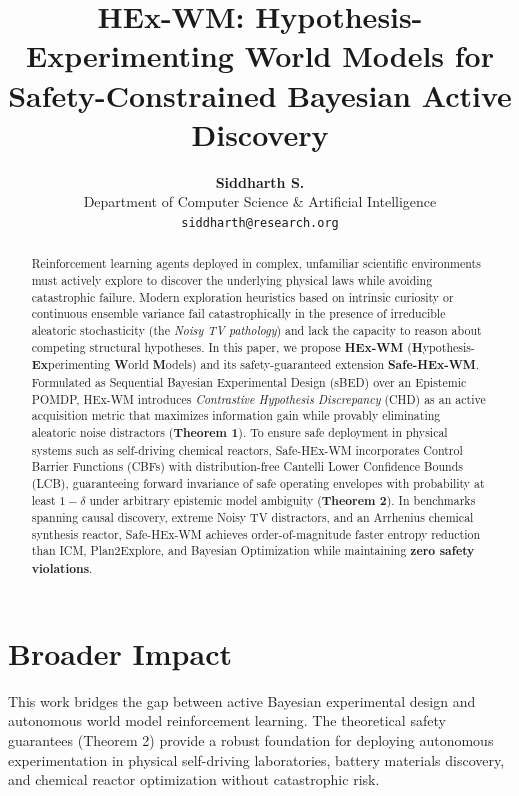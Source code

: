 \documentclass{article}
\title{\textbf{HEx-WM: Hypothesis-Experimenting World Models for Safety-Constrained Bayesian Active Discovery}}
\author{
  \textbf{Siddharth S.}\\
  Department of Computer Science \& Artificial Intelligence\\
  \texttt{siddharth@research.org}
}
\begin{document}
\maketitle

\begin{abstract}
Reinforcement learning agents deployed in complex, unfamiliar scientific environments must actively explore to discover the underlying physical laws while avoiding catastrophic failure. Modern exploration heuristics based on intrinsic curiosity or continuous ensemble variance fail catastrophically in the presence of irreducible aleatoric stochasticity (the \emph{Noisy TV pathology}) and lack the capacity to reason about competing structural hypotheses. In this paper, we propose \textbf{HEx-WM} (\textbf{H}ypothesis-\textbf{Ex}perimenting \textbf{W}orld \textbf{M}odels) and its safety-guaranteed extension \textbf{Safe-HEx-WM}. Formulated as Sequential Bayesian Experimental Design (sBED) over an Epistemic POMDP, HEx-WM introduces \emph{Contrastive Hypothesis Discrepancy} (CHD) as an active acquisition metric that maximizes information gain while provably eliminating aleatoric noise distractors (\textbf{Theorem 1}). To ensure safe deployment in physical systems such as self-driving chemical reactors, Safe-HEx-WM incorporates Control Barrier Functions (CBFs) with distribution-free Cantelli Lower Confidence Bounds (LCB), guaranteeing forward invariance of safe operating envelopes with probability at least $1 - \delta$ under arbitrary epistemic model ambiguity (\textbf{Theorem 2}). In benchmarks spanning causal discovery, extreme Noisy TV distractors, and an Arrhenius chemical synthesis reactor, Safe-HEx-WM achieves order-of-magnitude faster entropy reduction than ICM, Plan2Explore, and Bayesian Optimization while maintaining \textbf{zero safety violations}.
\end{abstract}







\section*{Broader Impact}
This work bridges the gap between active Bayesian experimental design and autonomous world model reinforcement learning. The theoretical safety guarantees (Theorem 2) provide a robust foundation for deploying autonomous experimentation in physical self-driving laboratories, battery materials discovery, and chemical reactor optimization without catastrophic risk.




\newpage

\end{document}
